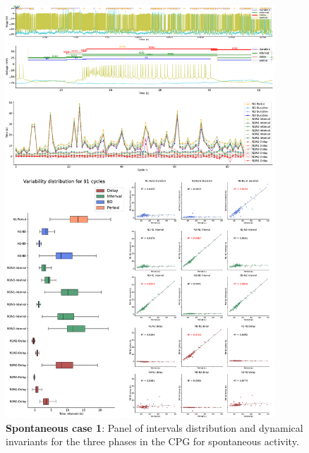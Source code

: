 \begin{figure}[htbp]
	\centering
	\includegraphics[width=0.9\textwidth]{./invariants/data/SUSSEX/prep2/images/3phases/panel_with_intervals.pdf}
	\caption{\textbf{Spontaneous case 1}: Panel of intervals distribution and dynamical invariants for the three phases in the CPG for spontaneous activity.}
	\label{fig:prep2 invariants}
\end{figure}

